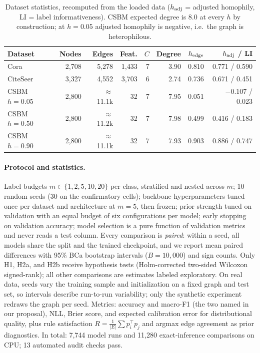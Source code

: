 \documentclass{article}
\begin{document}
\begin{table}[t]
\caption{Dataset statistics, recomputed from the loaded data ($h_{\rm adj}$ = adjusted
homophily, LI = label informativeness). CSBM expected degree is 8.0 at every $h$ by
construction; at $h{=}0.05$ adjusted homophily is negative, i.e.\ the graph is heterophilous.}
\label{tab:data}
\begin{center}
\small
\begin{tabular}{lrrrrrrr}
\toprule
\textbf{Dataset} & \textbf{Nodes} & \textbf{Edges} & \textbf{Feat.} & \textbf{$C$} &
\textbf{Degree} & \textbf{$h_{\rm edge}$} & \textbf{$h_{\rm adj}$ / LI} \\
\midrule
Cora            & 2{,}708 & 5{,}278 & 1{,}433 & 7 & 3.90 & 0.810 & 0.771 / 0.590 \\
CiteSeer        & 3{,}327 & 4{,}552 & 3{,}703 & 6 & 2.74 & 0.736 & 0.671 / 0.451 \\
CSBM $h{=}0.05$ & 2{,}800 & $\approx$11.1k & 32 & 7 & 7.95 & 0.051 & $-0.107$ / 0.023 \\
CSBM $h{=}0.50$ & 2{,}800 & $\approx$11.2k & 32 & 7 & 7.98 & 0.499 & 0.416 / 0.183 \\
CSBM $h{=}0.90$ & 2{,}800 & $\approx$11.1k & 32 & 7 & 7.93 & 0.903 & 0.886 / 0.747 \\
\bottomrule
\end{tabular}
\end{center}
\end{table}

\paragraph{Protocol and statistics.} Label budgets $m\in\{1,2,5,10,20\}$ per class, stratified
and nested across $m$; 10 random seeds (30 on the confirmatory cells); backbone hyperparameters
tuned once per dataset and architecture at $m{=}5$, then frozen; prior strength tuned on
validation with an equal budget of six configurations per model; early stopping on validation
accuracy; model selection is a pure function of validation metrics and never reads a test
column. Every comparison is \emph{paired}: within a seed, all models share the split and the
trained checkpoint, and we report mean paired differences with 95\% BCa bootstrap intervals
($B{=}10{,}000$) and sign counts. Only H1, H2a, and H2b receive hypothesis tests
(Holm-corrected two-sided Wilcoxon signed-rank); all other comparisons are estimates labeled
exploratory. On real data, seeds vary the training sample and initialization on a fixed graph
and test set, so intervals describe run-to-run variability; only the synthetic experiment
redraws the graph per seed. Metrics: accuracy and macro-F1 (the two named in our proposal),
NLL, Brier score, and expected calibration error for distributional quality, plus rule
satisfaction $R=\frac{1}{|E|}\sum p_i^\top p_j$ and argmax edge agreement as prior diagnostics.
In total: 7{,}744 model runs and 11{,}280 exact-inference comparisons on CPU; 13 automated
audit checks pass.
\end{document}
